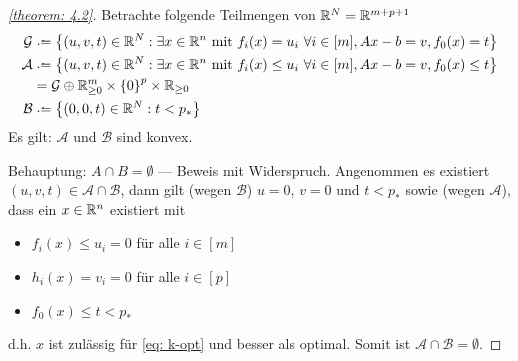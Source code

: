 \begin{proof}[\cref{theorem: 4.2}]
	Betrachte folgende Teilmengen von $\mathbb{R}^N = \mathbb{R}^{m+p+1}$
	\begin{equation*}
		\begin{aligned}
			\mathcal{G} &\defeq \menge{(u,v,t) \in \R^N : \exists x \in \Rn \text{ mit } f_i(x) = u_i \ \forall i \in [m] , Ax - b = v, f_0(x) = t} \\
			\mathcal{A} &\defeq \menge{(u,v,t) \in \R^N : \exists x \in \Rn \text{ mit } f_i(x) \le u_i \ \forall i \in [m], Ax - b = v, f_0(x) \le t} \\
			&= \mathcal{G} \oplus \Rm_{\ge 0} \times \menge{0}^p \times \R_{\ge 0} \\
			\mathcal{B} &\defeq \menge{(0,0,t) \in \R^N : t < p_\ast}
		\end{aligned}
	\end{equation*}
	Es gilt: $\mathcal{A}$ und $\mathcal{B}$ sind konvex.
	
	Behauptung: $A \cap B = \emptyset$ --- Beweis mit Widerspruch. Angenommen es existiert $(u,v,t) \in \mathcal{A} \cap \mathcal{B}$, dann gilt (wegen $\mathcal{B}$) $u = 0$, $v=0$ und $t < p_\ast$ sowie (wegen $\mathcal{A}$), dass ein $x \in \mathbb{R}^n$ existiert mit 
	\begin{itemize}
		\item $f_i(x) \le u_i = 0$ für alle $i \in [m]$ 
		\item $h_i(x) = v_i = 0$ für alle $i \in [p]$
		\item $f_0(x) \le t < p_\ast$ 
	\end{itemize}
	d.h. $x$ ist zulässig für \eqref{eq: k-opt} und besser als optimal.
	Somit ist $\mathcal{A} \cap \mathcal{B} = \emptyset$.
	

\end{proof}
